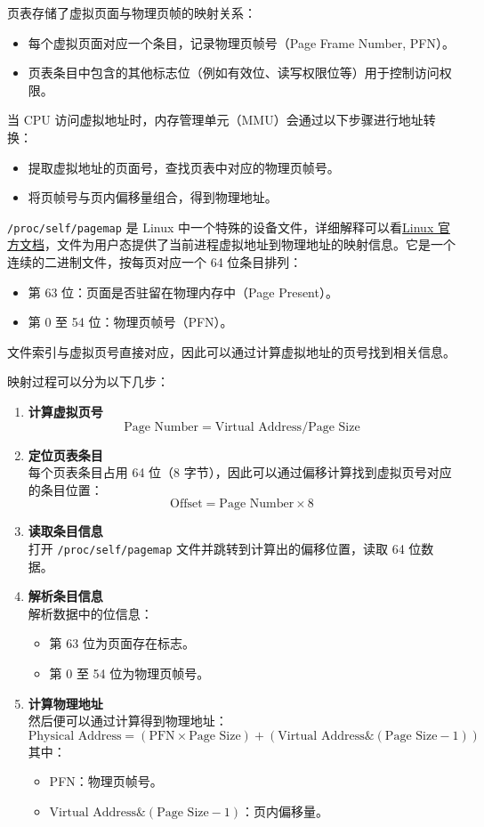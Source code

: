 页表存储了虚拟页面与物理页帧的映射关系：
\begin{itemize}
    \item 每个虚拟页面对应一个条目，记录物理页帧号（Page Frame Number, PFN）。
    \item 页表条目中包含的其他标志位（例如有效位、读写权限位等）用于控制访问权限。
\end{itemize}

当 CPU 访问虚拟地址时，内存管理单元（MMU）会通过以下步骤进行地址转换：
\begin{itemize}
    \item 提取虚拟地址的页面号，查找页表中对应的物理页帧号。
    \item 将页帧号与页内偏移量组合，得到物理地址。
\end{itemize}

\texttt{/proc/self/pagemap} 是 Linux 中一个特殊的设备文件，详细解释可以看\href{https://www.kernel.org/doc/Documentation/vm/pagemap.txt}{Linux 官方文档}，文件为用户态提供了当前进程虚拟地址到物理地址的映射信息。它是一个连续的二进制文件，按每页对应一个 64 位条目排列：
\begin{itemize}
    \item 第 63 位：页面是否驻留在物理内存中（Page Present）。
    \item 第 0 至 54 位：物理页帧号（PFN）。
\end{itemize}

文件索引与虚拟页号直接对应，因此可以通过计算虚拟地址的页号找到相关信息。

映射过程可以分为以下几步：
\begin{enumerate}
    \item \textbf{计算虚拟页号}
    \[
    \text{Page Number} = \text{Virtual Address} / \text{Page Size}
    \]
    \item \textbf{定位页表条目} \\
    每个页表条目占用 64 位（8 字节），因此可以通过偏移计算找到虚拟页号对应的条目位置：
    \[
    \text{Offset} = \text{Page Number} \times 8
    \]
    \item \textbf{读取条目信息} \\
    打开 \texttt{/proc/self/pagemap} 文件并跳转到计算出的偏移位置，读取 64 位数据。
    \item \textbf{解析条目信息} \\
    解析数据中的位信息：
    \begin{itemize}
        \item 第 63 位为页面存在标志。
        \item 第 0 至 54 位为物理页帧号。
    \end{itemize}
    \item \textbf{计算物理地址} \\
    然后便可以通过计算得到物理地址：
    \[
    \text{Physical Address} = (\text{PFN} \times \text{Page Size}) + (\text{Virtual Address} \& (\text{Page Size} - 1))
    \]
    其中：
    \begin{itemize}
        \item PFN：物理页帧号。
        \item $\text{Virtual Address} \& (\text{Page Size} - 1)$：页内偏移量。
    \end{itemize}
\end{enumerate}

